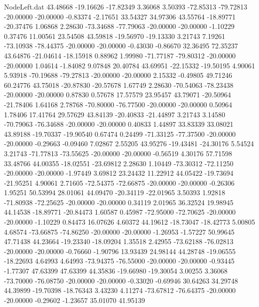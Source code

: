 \begin{filecontents}{NodeLeft.dat}
  43.48668  -19.16626  -17.82349     3.36068    3.50393  -72.85313  -79.72813  -20.00000  -20.00000   -0.83374   -2.17651   33.54327   34.97306
  43.55764  -18.89771  -20.37476     1.06868    2.28630  -73.34688  -77.79063  -20.00000  -20.00000   -1.10229    0.37476   11.00561   23.54508
  43.59818  -19.56970  -19.13330     3.21743    7.19261  -73.10938  -78.44375  -20.00000  -20.00000   -0.43030   -0.86670   32.36495   72.35237
  43.64876  -21.04614  -18.15918     0.88962    1.99980  -71.77187  -79.80312  -20.00000  -20.00000    1.04614   -1.84082    9.07848   20.40784
  43.69951  -22.15332  -19.50195     4.90061    5.93918  -70.19688  -79.27813  -20.00000  -20.00000    2.15332   -0.49805   49.71246   60.24776
  43.75018  -20.87830  -20.57678     1.67749    2.28630  -70.54063  -78.23438  -20.00000  -20.00000    0.87830    0.57678   17.57579   23.95457
  43.79071  -20.50964  -21.78406     1.64168    2.78768  -70.80000  -76.77500  -20.00000  -20.00000    0.50964    1.78406   17.41764   29.57629
  43.84139  -20.40833  -21.44897     3.21743    3.14580  -70.79063  -76.34688  -20.00000  -20.00000    0.40833    1.44897   33.83339   33.08021
  43.89188  -19.70337  -19.90540     0.67474    0.24499  -71.33125  -77.37500  -20.00000  -20.00000   -0.29663   -0.09460    7.02867    2.55205
  43.95276  -19.43481  -24.30176     5.54524    3.21743  -71.77813  -73.55625  -20.00000  -20.00000   -0.56519    4.30176   57.71598   33.48766
  44.00355  -18.02551  -23.69812     2.28630    1.10449  -73.30312  -72.11250  -20.00000  -20.00000   -1.97449    3.69812   23.24432   11.22912
  44.05422  -19.73694  -21.95251     4.90061    2.71605  -72.54375  -72.66875  -20.00000  -20.00000   -0.26306    1.95251   50.53994   28.01061
  44.09470  -20.34119  -22.01965     3.50393    1.92818  -71.80938  -72.25625  -20.00000  -20.00000    0.34119    2.01965   36.32524   19.98945
  44.14538  -18.89771  -20.84473     1.60587    0.45987  -72.95000  -72.70625  -20.00000  -20.00000   -1.10229    0.84473   16.07626    4.60372
  44.19612  -18.73047  -18.42773     5.00805    4.68574  -73.66875  -74.86250  -20.00000  -20.00000   -1.26953   -1.57227   50.99645   47.71438
  44.23664  -19.23340  -18.09204     1.35518    2.42955  -73.62188  -76.02813  -20.00000  -20.00000   -0.76660   -1.90796   13.93439   24.98144
  44.28748  -19.06555  -18.22693     4.64993    4.64993  -73.94375  -76.55000  -20.00000  -20.00000   -0.93445   -1.77307   47.63399   47.63399
  44.35836  -19.66980  -19.30054     3.00255    3.36068  -73.70000  -76.08750  -20.00000  -20.00000   -0.33020   -0.69946   30.64263   34.29748
  44.39899  -19.70398  -18.76343     3.43230    4.11274  -73.67812  -76.64375  -20.00000  -20.00000   -0.29602   -1.23657   35.01070   41.95139

\end{filecontents}
